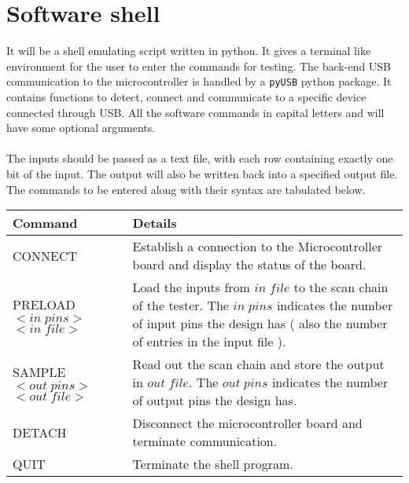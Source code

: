 \documentclass{article}
\begin{document}
\section{Software shell}
It will be a shell emulating script written in python. It gives a terminal like environment for the user to enter the commands for testing.
The back-end USB communication to the microcontroller is handled by a \texttt{pyUSB} python package. It contains functions to detect, connect and communicate to a specific device connected through USB. All the software commands in capital letters and will have some optional arguments.
\paragraph*{}
The inputs should be passed as a text file, with each row containing exactly one bit of the input. The output will also be written back into a specified output file. The commands to be entered along with their syntax are tabulated below.

\begin{center}

\begin{table}[h]
\begin{tabular}{@{}p{7cm}p{9cm}@{}}
\toprule
 \textbf{Command} &  \textbf{Details}\\ \toprule
 CONNECT &  Establish a connection to the Microcontroller board and display the status of the board.\\ \midrule
 PRELOAD $<in\; pins>$ $<in\; file>$ &  Load the inputs from $in\;file$ to the scan chain of the tester. The $in\; pins$ indicates the number of input pins the design has ( also the number of entries in the input file ).\\ \midrule
 SAMPLE $<out\; pins>$ $<out\; file>$ &  Read out the scan chain and store the output in $out\; file$. The $out\; pins$ indicates the number of output pins the design has.\\ \midrule
 DETACH &  Disconnect the microcontroller board and terminate communication.\\ \midrule
 QUIT &  Terminate the shell program.\\
 \bottomrule
\end{tabular}
\end{table}
 
\end{center}
\end{document}
